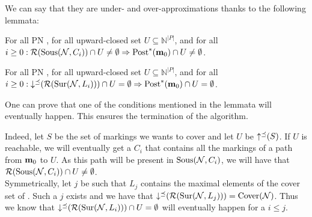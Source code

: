 We can say that they are under- and over-approximations thanks to the following lemmata:
\begin{lemm}
  For all \ac{PN} \NPTm, for all upward-closed set $U \subseteq \mathbb{N}^{|P|}$, and for all $i \geq 0: \operatorname{\mathcal{R}}(\operatorname{Sous}(\mathcal{N},C_i)) \cap U \neq \emptyset \Rightarrow \operatorname{Post}^*(\mathbf{m}_0) \cap U \neq \emptyset$.
\end{lemm}
\begin{lemm}
  For all \ac{PN} \NPTm, for all upward-closed set $U \subseteq \mathbb{N}^{|P|}$, and for all $i \geq 0: \operatorname{\downarrow^\preceq}(\operatorname{\mathcal{R}}(\operatorname{Sur}(\mathcal{N},L_i))) \cap U = \emptyset \Rightarrow \operatorname{Post}^*(\mathbf{m}_0) \cap U = \emptyset$.
\end{lemm}

One can prove that one of the conditions mentioned in the lemmata will eventually happen.
This ensures the termination of the algorithm.

Indeed, let $S$ be the set of markings we wants to cover and let $U$ be $\operatorname{\uparrow^\preceq}(S)$.
If $U$ is reachable, we will eventually get a $C_i$ that contains all the markings of a path from $\mathbf{m}_0$ to $U$.
As this path will be present in $\operatorname{Sous}(\mathcal{N}, C_i)$, we will have that $\operatorname{\mathcal{R}}(\operatorname{Sous}(\mathcal{N},C_i)) \cap U \neq \emptyset$.\\
Symmetrically, let $j$ be such that $L_j$ contains the maximal elements of the cover set of \tupleN.
Such a $j$ exists and we have that $\operatorname{\downarrow^\preceq}(\operatorname{\mathcal{R}}(\operatorname{Sur}(\mathcal{N},L_j))) = \operatorname{Cover}(\mathcal{N})$.
Thus we know that $\operatorname{\downarrow^\preceq}(\operatorname{\mathcal{R}}(\operatorname{Sur}(\mathcal{N},L_i))) \cap U = \emptyset$ will eventually happen for a $i \leq j$.


